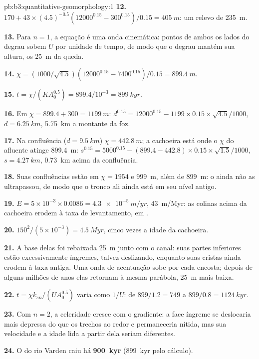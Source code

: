 \begin{solution}{pb:b3:quantitative-geomorphology:1}
\textbf{12.} $170 + 43\times(4.5)^{-0.5}(12000^{0.15} - 300^{0.15})/0.15 =
\qty{405}{m}$: um relevo de \qty{235}{m}.

\textbf{13.} Para $n = 1$, a equação é uma onda cinemática: pontos de ambos os
lados do degrau sobem $U$ por unidade de tempo, de modo que o degrau mantém sua altura,
os \qty{25}{m} da queda.

\textbf{14.} $\chi = (1000/\sqrt{4.5})(12000^{0.15} - 7400^{0.15})/0.15 =
\qty{899.4}{m}$.

\textbf{15.} $t = \chi/(KA_0^{0.5}) = 899.4/10^{-3} = \qty{899}{kyr}$.

\textbf{16.} Em $\chi = 899.4 + 300 = \qty{1199}{m}$:
$d^{0.15} = 12000^{0.15} - 1199\times0.15\times\sqrt{4.5}/1000$, $d =
\qty{6.25}{km}$, \qty{5.75}{km} a montante da foz.

\textbf{17.} Na confluência ($d = \qty{9.5}{km}$) $\chi = \qty{442.8}{m}$;
a cachoeira está onde o $\chi$ do afluente atinge \qty{899.4}{m}:
$s^{0.15} = 5000^{0.15} - (899.4 - 442.8)\times0.15\times\sqrt{1.5}/1000$,
$s = \qty{4.27}{km}$, \qty{0.73}{km} acima da confluência.

\textbf{18.} Suas confluências estão em $\chi = 1954$ e \qty{999}{m}, além de
\qty{899}{m}: o  ainda não as ultrapassou, de modo que o tronco ali
ainda está em seu nível antigo.

\textbf{19.} $E = 5\times10^{-3}\times0.0086 = \qty{4.3e-5}{m/yr}$,
\qty{43}{m/Myr}: as colinas acima da cachoeira erodem à taxa de levantamento,
em .

\textbf{20.} $150^2/(5\times10^{-3}) = \qty{4.5}{Myr}$, cinco vezes a idade da
cachoeira.

\textbf{21.} A base delas foi rebaixada \qty{25}{m} junto com o canal: suas
partes inferiores estão excessivamente íngremes, talvez deslizando, enquanto suas cristas ainda
erodem à taxa antiga. Uma onda de acentuação sobe por cada encosta; depois de alguns
milhões de anos elas retornam à mesma parábola, \qty{25}{m} mais baixa.

\textbf{22.} $t = \chi k_{sn}/(U A_0^{0.5})$ varia como $1/U$: de
$899/1.2 = 749$ a $899/0.8 = \qty{1124}{kyr}$.

\textbf{23.} Com $n = 2$, a celeridade cresce com o gradiente: a face íngreme
se deslocaria mais depressa do que os trechos ao redor e permaneceria nítida, mas
sua velocidade e a idade lida a partir dela seriam diferentes.

\textbf{24.} O  do rio Varden caiu
há \textbf{\qty[text-series-to-math=true]{900}{kyr}} (\qty{899}{kyr} pelo
cálculo).
\end{solution}

